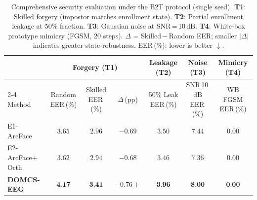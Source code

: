 
\begin{table}[t]
\centering
\caption{Comprehensive security evaluation under the B2T protocol (single seed).
\textbf{T1}: Skilled forgery (impostor matches enrollment state).
\textbf{T2}: Partial enrollment leakage at 50\% fraction.
\textbf{T3}: Gaussian noise at SNR\,=\,10\,dB.
\textbf{T4}: White-box prototype mimicry (FGSM, 20 steps).
$\Delta$ = Skilled\,$-$\,Random EER; smaller $|\Delta|$ indicates greater state-robustness.
EER\,(\%): lower is better $\downarrow$.}
\label{tab:tifs_security}
\setlength{\tabcolsep}{6pt}
\begin{tabular}{lcccccc}
\toprule
& \multicolumn{3}{c}{\textbf{Forgery (T1)}} & \textbf{Leakage (T2)} & \textbf{Noise (T3)} & \textbf{Mimicry (T4)} \\
\cmidrule(lr){2-4}
Method & Random EER\,(\%) & Skilled EER\,(\%) & $\Delta$\,(pp) & 50\% Leak EER\,(\%) & SNR\,10\,dB EER\,(\%) & WB FGSM EER\,(\%) \\
\midrule
    E1-ArcFace & $3.65$ & $2.96$ & $-0.69$ & $3.50$ & $7.44$ & $0.00$ \\
    E2-ArcFace$+$Orth & $3.62$ & $2.94$ & $-0.68$ & $3.46$ & $7.36$ & $0.00$ \\
    \textbf{DOMCS-EEG} & $\textbf{4.17}$ & $\textbf{3.41}$ & $-0.76+$ & $\textbf{3.96}$ & $\textbf{8.00}$ & $\textbf{0.00}$ \\
\bottomrule
\end{tabular}
\end{table}
